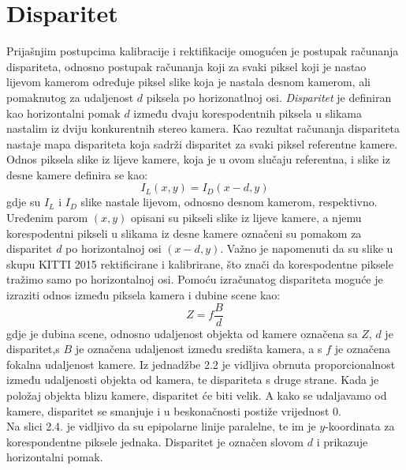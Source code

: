 \documentclass[times, utf8, zavrsni, numeric]{fer}
\begin{document}
\section{Disparitet}
Prijašnjim postupcima kalibracije i rektifikacije omogućen je postupak računanja dispariteta, odnosno postupak računanja koji za svaki piksel koji je nastao lijevom kamerom određuje piksel slike koja je nastala desnom kamerom, ali pomaknutog za udaljenost $d$ piksela po horizonatlnoj osi. \textit{Disparitet} je definiran kao horizontalni pomak $d$ između dvaju korespodentnih piksela u slikama nastalim iz dviju konkurentnih stereo kamera. Kao rezultat računanja dispariteta nastaje mapa dispariteta koja sadrži disparitet za svaki piksel referentne kamere. Odnos piksela slike iz lijeve kamere, koja je u ovom slučaju referentna, i slike iz desne kamere definira se kao: 
\begin{equation}
I_{L}(x, y) = I_{D}(x-d,y)
\label{eq:Disparitet}
\end{equation}
gdje su $I_{L}$ i $I_{D}$ slike nastale lijevom, odnosno desnom kamerom, respektivno. Uređenim parom $(x,y)$ opisani su pikseli slike iz lijeve kamere, a njemu korespodentni pikseli u slikama iz desne kamere označeni su pomakom za disparitet $d$ po horizontalnoj osi $(x-d,y)$. Važno je napomenuti da su slike u skupu KITTI 2015 rektificirane i kalibrirane, što znači da korespodentne piksele tražimo samo po horizontalnoj osi.
Pomoću izračunatog dispariteta moguće je izraziti odnos između piksela kamera i dubine scene kao:
\begin{equation}
Z=f\frac{B}{d}
\label{eq:Fokalna}
\end{equation}
gdje je dubina scene, odnosno udaljenost objekta od kamere označena sa $Z$, $d$ je disparitet,s $B$ je označena udaljenost između središta kamera, a s $f$ je označena fokalna udaljenost kamere. Iz jednadžbe 2.2 je vidljiva obrnuta proporcionalnost između udaljenosti objekta od kamera, te dispariteta s druge strane. Kada je položaj objekta blizu kamere, disparitet će biti velik. A kako se udaljavamo od kamere, disparitet se smanjuje i u beskonačnosti postiže vrijednost 0.\\
Na slici 2.4. je vidljivo da su epipolarne linije paralelne, te im je $y$-koordinata za korespondentne piksele jednaka. Disparitet je označen slovom $d$ i prikazuje horizontalni pomak.
\end{document}

